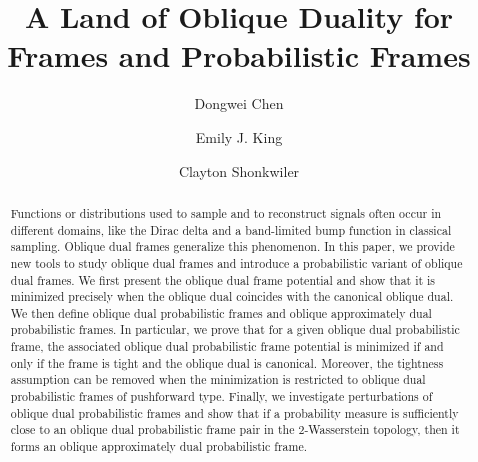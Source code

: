 \documentclass{amsart}
\numberwithin{equation}{section}
\theoremstyle{plain}
\theoremstyle{remark}
\theoremstyle{definition}
\begin{document}

\title[A Land of Oblique Duality for Frames]{A Land of Oblique Duality for Frames and Probabilistic Frames}


\author{Dongwei Chen}
\address{Department of Mathematics, Colorado State University, Fort Collins, CO, USA, 80523}

\author{Emily J. King}
\address{Department of Mathematics, Colorado State University, Fort Collins, CO, USA, 80523}

\author{Clayton Shonkwiler}
\address{Department of Mathematics, Colorado State University, Fort Collins, CO, USA, 80523}
 
\begin{abstract}
Functions or distributions used to sample and to reconstruct signals often occur in different domains, like the Dirac delta and a band-limited bump function in classical sampling. Oblique dual frames generalize this phenomenon.
In this paper, we provide new tools to study oblique dual frames and introduce a probabilistic variant of oblique dual frames. 
We first present the oblique dual frame potential and show that it is 
minimized precisely when the oblique dual coincides with the canonical 
oblique dual. We then define oblique dual probabilistic frames and 
oblique approximately dual probabilistic frames. In particular, we prove 
that for a given oblique dual probabilistic frame, the associated oblique 
dual probabilistic frame potential is minimized if and only if the frame 
is tight and the oblique dual is canonical. Moreover, the tightness 
assumption can be removed when the minimization is restricted to oblique 
dual probabilistic frames of pushforward type. Finally, we investigate 
perturbations of oblique dual probabilistic frames and show that if a 
probability measure is sufficiently close to an oblique dual 
probabilistic frame pair in the $2$-Wasserstein topology, then it forms an 
oblique approximately dual probabilistic frame.
\end{abstract}

\maketitle
\end{document}
